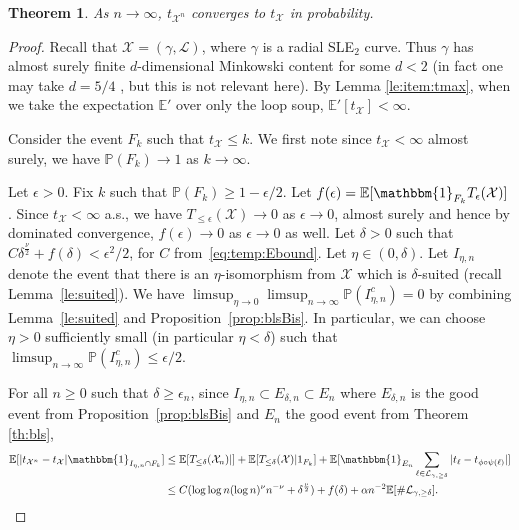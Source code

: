 \documentclass[11pt]{article}
\newtheorem{theorem}{Theorem}[section]
\def\P{{\mathbb P}}
\begin{document}
\begin{theorem}
\label{th:tCV}
  As $n\to\infty$, $t_{\mathcal{X}^n}$ converges to $t_{\mathcal{X}}$ in probability.
\end{theorem}
\begin{proof}
  Recall that $\mathcal{X} = (\gamma, \mathcal{L})$, where $\gamma$ is a radial SLE$_2$ curve. Thus $\gamma$ has almost surely finite $d$-dimensional Minkowski content for some $d<2$ (in fact one may take $d = 5/4$ \cite{LawlerRezaei}, but this is not relevant here).   By Lemma \ref{le:item:tmax}, when we take the expectation $\mathbb{E}'$ over only the loop soup,   
  $\mathbb{E}'[t_{\mathcal{X}} ]< \infty$. 


Consider the event $F_k$ such that $t_{\mathcal{X}}\le k$. We first note since $t_{\mathcal{X}}< \infty$ almost surely, we have $\mathbb{P}( F_k) \to 1$ as $k \to \infty$. 

    Let $\epsilon>0$. Fix $k$ such that $\mathbb{P}(F_k) \ge 1-\epsilon/2$. %
  Let $f(\epsilon)=\mathbb{E}[\mathbbm{1}_{F_k} T_\epsilon(\mathcal{X})]$. 
  Since $t_{\mathcal{X}} < \infty$ a.s., we have $T_{\leq \epsilon}( \mathcal{X}) \to 0 $ as $\epsilon \to 0$, almost surely and hence by dominated convergence,
   $f(\epsilon)\to 0$ as $\epsilon \to 0$ as well. Let $\delta>0$ such that $C\delta^{\frac{\nu}{2}}+f(\delta)<\epsilon^2/2$, for $C$ from~\eqref{eq:temp:Ebound}.
  Let $\eta\in(0,\delta)$. Let $I_{\eta, n}$ denote the event that there is an $\eta$-isomorphism from $\mathcal{X}$ which is $\delta$-suited (recall Lemma~\ref{le:suited}). We have $\limsup_{\eta \to 0} \limsup_{n\to \infty} \P( I_{\eta, n}^c) = 0$ by combining Lemma~\ref{le:suited} and Proposition~\ref{prop:blsBis}. In particular, we can choose $\eta>0$ sufficiently small (in particular $\eta< \delta$) such that $\limsup_{n\to \infty} \mathbb{P}(I_{\eta, n}^c) \le \epsilon/2$. 

For all $n\geq 0$ such that $\delta\geq \epsilon_n$, since $I_{\eta, n} \subset E_{\delta , n} \subset E_n$ where $E_{\delta, n}$ is the good event from Proposition~\ref{prop:blsBis} and $E_n$ the good event from Theorem \ref{th:bls},
  \begin{align*}
  \mathbb{E}[ |t_{\mathcal{X}^n}-t_{\mathcal{X}}|\mathbbm{1}_{I_{\eta,n} \cap F_k} ]
  &\leq \mathbb{E}[T_{ \leq \delta}(\mathcal{X}_n)| ]+ \mathbb{E}[T_{\leq  \delta}(\mathcal{X})|1_{F_k} ]
  +\mathbb{E}[ \mathbbm{1}_{E_{n}} \sum_{\ell\in \mathcal{L}_{\gamma,\geq \delta}} |t_\ell-t_{\phi\circ \psi(\ell)}|    ]\\
  &\leq  C (\log\log n (\log n)^\nu n^{-\nu}+ \delta^{\frac{\nu}{2}}) +f(\delta)+ \alpha n^{-2}\mathbb{E}[  \#  \mathcal{L}_{\gamma,\geq \delta}].
  \end{align*}
  

\end{proof}
\end{document}
